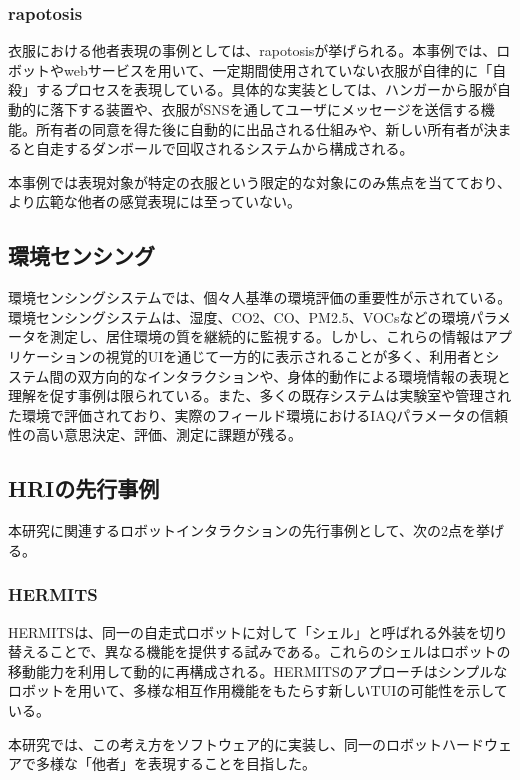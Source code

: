\documentclass{cuxarticle}
\begin{document}
\subsubsection{rapotosis}
衣服における他者表現の事例としては、rapotosis\cite{--ソンヨン}が挙げられる。本事例では、ロボットやwebサービスを用いて、一定期間使用されていない衣服が自律的に「自殺」するプロセスを表現している。具体的な実装としては、ハンガーから服が自動的に落下する装置や、衣服がSNSを通してユーザにメッセージを送信する機能。所有者の同意を得た後に自動的に出品される仕組みや、新しい所有者が決まると自走するダンボールで回収されるシステムから構成される。

本事例では表現対象が特定の衣服という限定的な対象にのみ焦点を当てており、より広範な他者の感覚表現には至っていない。

\subsection{環境センシング}
環境センシングシステムでは、個々人基準の環境評価の重要性が示されている\cite{Saini-2020-IndoorAirQualityMonitoring}。環境センシングシステムは、湿度、CO2、CO、PM2.5、VOCsなどの環境パラメータを測定し、居住環境の質を継続的に監視する。しかし、これらの情報はアプリケーションの視覚的UIを通じて一方的に表示されることが多く、利用者とシステム間の双方向的なインタラクションや、身体的動作による環境情報の表現と理解を促す事例は限られている。また、多くの既存システムは実験室や管理された環境で評価されており、実際のフィールド環境におけるIAQパラメータの信頼性の高い意思決定、評価、測定に課題が残る。

\subsection{HRIの先行事例}
本研究に関連するロボットインタラクションの先行事例として、次の2点を挙げる。

\subsubsection{HERMITS}
HERMITS\cite{--HERMITSProceedings33rdAnnual}は、同一の自走式ロボットに対して「シェル」と呼ばれる外装を切り替えることで、異なる機能を提供する試みである。これらのシェルはロボットの移動能力を利用して動的に再構成される。HERMITSのアプローチはシンプルなロボットを用いて、多様な相互作用機能をもたらす新しいTUIの可能性を示している。

本研究では、この考え方をソフトウェア的に実装し、同一のロボットハードウェアで多様な「他者」を表現することを目指した。
\end{document}
